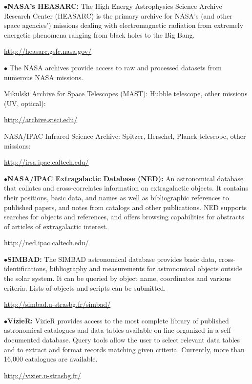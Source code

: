 \medskip

\item{$\bullet$}{\bf NASA's HEASARC:}
The High Energy Astrophysics Science Archive Research Center (HEASARC) is the primary archive for NASA's (and other space agencies') missions dealing with electromagnetic radiation from extremely energetic phenomena ranging from black holes to the Big Bang.
	\item{}\qquad\url{http://heasarc.gsfc.nasa.gov/}

\medskip

\item{$\bullet$}
The NASA archives provide access to raw and processed datasets from numerous NASA missions.
\item{}
Mikulski Archive for Space Telescopes (MAST): Hubble telescope, other missions (UV, optical):
	\item{}\qquad\url{http://archive.stsci.edu/}
\item{}
NASA/IPAC Infrared Science Archive: Spitzer, Herschel, Planck telescope, other missions: \item{}\qquad\url{http://irsa.ipac.caltech.edu/}

\medskip

\item{$\bullet$}{\bf NASA/IPAC Extragalactic Database (NED):}
An astronomical database that collates and cross-correlates information on extragalactic objects. It contains their positions, basic data, and names as well as bibliographic references to published papers, and notes from catalogs and other publications. NED supports searches for objects and references, and offers browsing capabilities for abstracts of articles of extragalactic interest.
	\item{}\qquad\url{http://ned.ipac.caltech.edu/}

\medskip

\item{$\bullet$}{\bf SIMBAD:}
The SIMBAD astronomical database provides basic data, cross-identifications, bibliography and measurements for astronomical objects outside the solar system. It can be queried by object name, coordinates and various criteria. Lists of objects and scripts can be submitted.
	\item{}\qquad\url{http://simbad.u-strasbg.fr/simbad/}

\medskip

\item{$\bullet$}{\bf VizieR:}
VizieR provides access to the most complete library of published astronomical catalogues and data tables available on line organized in a self-documented database. Query tools allow the user to select relevant data tables and to extract and format records matching given criteria. Currently, more than 16,000 catalogues are available.
	\item{}\qquad\url{http://vizier.u-strasbg.fr/}


